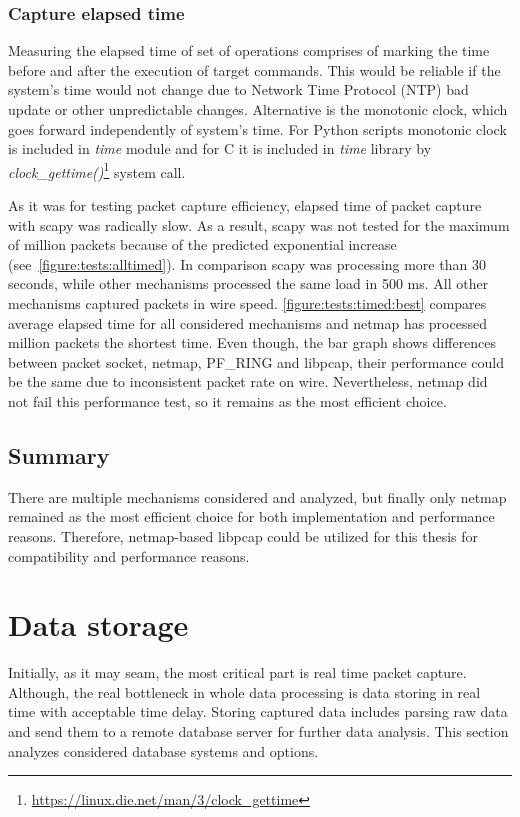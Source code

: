 \documentclass[12pt,a4paper,twoside]{report}
\begin{document}
			\subsubsection*{Capture elapsed time} \label{analysis:testing:results:timed}
				Measuring the elapsed time of set of operations comprises of marking the time before and after the execution of target commands. This would be reliable if the system's time would not change due to Network Time Protocol (NTP) bad update or other unpredictable changes. Alternative is the monotonic clock, which goes forward independently of system's time. For Python scripts monotonic clock is included in \emph{time} module and for C it is included in \emph{time} library by \emph{clock\_gettime()}\footnote{\url{https://linux.die.net/man/3/clock_gettime}} system call.\par
				As it was for testing packet capture efficiency, elapsed time of packet capture with scapy was radically slow. As a result, scapy was not tested for the maximum of million packets because of the predicted exponential increase (see~\autoref{figure:tests:alltimed}). In comparison scapy was processing more than 30 seconds, while other mechanisms processed the same load in 500 ms. All other mechanisms captured packets in wire speed. \autoref{figure:tests:timed:best} compares average elapsed time for all considered mechanisms and netmap has processed million packets the shortest time. Even though, the bar graph shows differences between packet socket, netmap, PF\_RING and libpcap, their performance could be the same due to inconsistent packet rate on wire. Nevertheless, netmap did not fail this performance test, so it remains as the most efficient choice.
		\subsection{Summary} \label{analysis:mechs:final}
			There are multiple mechanisms considered and analyzed, but finally only netmap remained as the most efficient choice for both implementation and performance reasons. Therefore, netmap-based libpcap could be utilized for this thesis for compatibility and performance reasons.
	\section{Data storage} \label{analysis:storage}
		Initially, as it may seam, the most critical part is real time packet capture. Although, the real bottleneck in whole data processing is data storing in real time with acceptable time delay. Storing captured data includes parsing raw data and send them to a remote database server for further data analysis. This section analyzes considered database systems and options.
\end{document}
